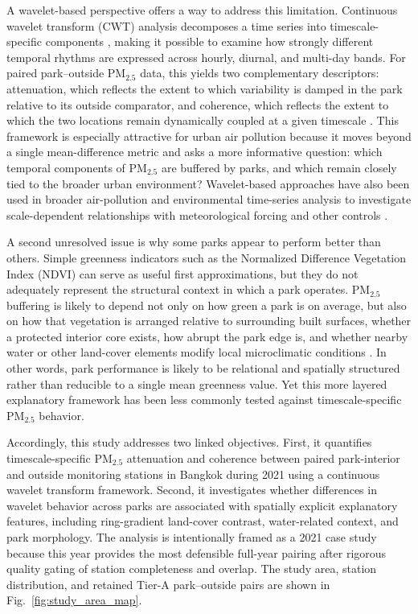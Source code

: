 A wavelet-based perspective offers a way to address this limitation. Continuous wavelet transform (CWT) analysis decomposes a time series into timescale-specific components \citep{Torrence1998, Cazelles2008}, making it possible to examine how strongly different temporal rhythms are expressed across hourly, diurnal, and multi-day bands. For paired park--outside PM$_{2.5}$ data, this yields two complementary descriptors: attenuation, which reflects the extent to which variability is damped in the park relative to its outside comparator, and coherence, which reflects the extent to which the two locations remain dynamically coupled at a given timescale \citep{Grinsted2004}. This framework is especially attractive for urban air pollution because it moves beyond a single mean-difference metric and asks a more informative question: which temporal components of PM$_{2.5}$ are buffered by parks, and which remain closely tied to the broader urban environment? Wavelet-based approaches have also been used in broader air-pollution and environmental time-series analysis to investigate scale-dependent relationships with meteorological forcing and other controls \citep{Li2014}.

A second unresolved issue is why some parks appear to perform better than others. Simple greenness indicators such as the Normalized Difference Vegetation Index (NDVI) \citep{Tucker1979} can serve as useful first approximations, but they do not adequately represent the structural context in which a park operates. PM$_{2.5}$ buffering is likely to depend not only on how green a park is on average, but also on how that vegetation is arranged relative to surrounding built surfaces, whether a protected interior core exists, how abrupt the park edge is, and whether nearby water or other land-cover elements modify local microclimatic conditions \citep{Vos2013, Wania2012, Barwise2020, Hewitt2020, Zhou2019}. In other words, park performance is likely to be relational and spatially structured rather than reducible to a single mean greenness value. Yet this more layered explanatory framework has been less commonly tested against timescale-specific PM$_{2.5}$ behavior.

Accordingly, this study addresses two linked objectives. First, it quantifies timescale-specific PM$_{2.5}$ attenuation and coherence between paired park-interior and outside monitoring stations in Bangkok during 2021 using a continuous wavelet transform framework. Second, it investigates whether differences in wavelet behavior across parks are associated with spatially explicit explanatory features, including ring-gradient land-cover contrast, water-related context, and park morphology. The analysis is intentionally framed as a 2021 case study because this year provides the most defensible full-year pairing after rigorous quality gating of station completeness and overlap. The study area, station distribution, and retained Tier-A park--outside pairs are shown in Fig.~\ref{fig:study_area_map}.

